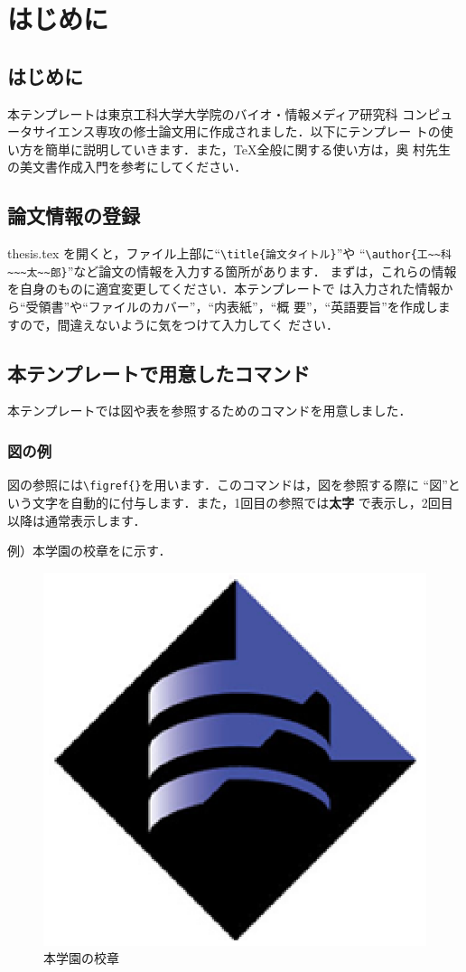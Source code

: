 \chapter{はじめに}
\section{はじめに}
本テンプレートは東京工科大学大学院\cite{teu}のバイオ・情報メディア研究科
コンピュータサイエンス専攻の修士論文用に作成されました．以下にテンプレー
トの使い方を簡単に説明していきます．また，{\TeX}全般に関する使い方は，奥
村先生の美文書作成入門\cite{okumura}を参考にしてください．

\section{論文情報の登録}
thesis.tex を開くと，ファイル上部に``\verb|\title{論文タイトル}|''や
``\verb|\author{工~~科~~~太~~郎}|''など論文の情報を入力する箇所があります．
まずは，これらの情報を自身のものに適宜変更してください．本テンプレートで
は入力された情報から``受領書''や``ファイルのカバー''，``内表紙''，``概
要''，``英語要旨''を作成しますので，間違えないように気をつけて入力してく
ださい．

\section{本テンプレートで用意したコマンド}
本テンプレートでは図や表を参照するためのコマンドを用意しました．

\subsection{図の例}
図の参照には\verb|\figref{}|を用います．このコマンドは，図を参照する際に
``図''という文字を自動的に付与します．また，1回目の参照では\textbf{太字}
で表示し，2回目以降は通常表示します．

例）本学園の校章をに示す．
\begin{figure}[tb]
 \centering
 \includegraphics[clip, width=0.5\linewidth]{teulogo_new.eps}
  \caption{本学園の校章}
 \label{fig:teu}
\end{figure}

